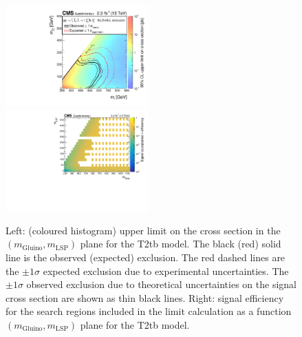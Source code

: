 \begin{figure}[t]
  \begin{center}
    \includegraphics[width=0.49\textwidth]{RA1T2tbXSEC_aux} \, 
    \includegraphics[width=0.49\textwidth]{T2tb_merging_4_cats_aux} \,     
  \end{center}
  \caption{Left: (coloured histogram) upper limit on the cross section in the $(m_{\mathrm{Gluino}},m_{\mathrm{LSP}})$ plane for the T2tb model. 
  The black (red) solid line is the observed (expected) exclusion. The red dashed lines are the $\pm1\sigma$ expected exclusion due to experimental uncertainties. 
  The $\pm1\sigma$ observed exclusion due to theoretical uncertainties on the signal cross section are shown as thin black lines. 
  Right: signal efficiency for the search regions included in the limit calculation as a function $(m_{\mathrm{Gluino}},m_{\mathrm{LSP}})$ plane for the T2tb model. 
  \label{fig:T2tb_excl}}
\end{figure}


